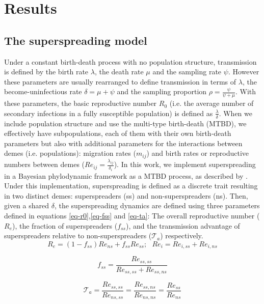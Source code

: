\documentclass[lineno,pdflatex,sn-nature]{sn-jnl}%
\theoremstyle{thmstyleone}%
\theoremstyle{thmstyletwo}%
\theoremstyle{thmstylethree}%
\begin{document}
\section{Results}\label{sec2}

\subsection{The superspreading model}
Under a constant birth-death process with no population structure, transmission is defined by the birth rate $\lambda$, the death rate $\mu$ and the sampling rate $\psi$. However these parameters are usually rearranged to define transmission in terms of $\lambda$, the become-uninfectious rate $\delta = \mu + \psi$ and the sampling proportion $\rho = \frac{\psi}{\psi + \mu}$. With these parameters, the basic reproductive number $R_0$ (i.e. the average number of secondary infections in a fully susceptible population) is defined as $\frac{\lambda}{\delta}$. When we include population structure and use the multi-type birth-death (MTBD), we effectively have subpopulations, each of them with their own birth-death parameters but also with additional parameters for the interactions between demes (i.e. populations): migration rates ($m_{ij}$) and birth rates or reproductive numbers between demes ($Re_{ij} = \frac{\lambda_{ij}}{\delta_i}$). In this work, we implement superspreading in a Bayesian phylodynamic framework as a MTBD process, as described by \cite{RefWorks:stadler2013uncovering, Meehan2023Replicating}. Under this implementation, superspreading is defined as a discrete trait resulting in two distinct demes: superspreaders (ss) and non-superspreaders (ns). Then, given a shared $\delta$, the superspreading dynamics are defined using three parameters defined in equations \ref{eq-r0},\ref{eq-fss} and \ref{eq-ta}: The overall reproductive number ($R_e$), the fraction of superspreaders ($f_{ss}$), and the transmission advantage of superspreaders relative to non-superspreaders ($\mathcal{T}_{a}$) respectively.
\begin{equation}
R_{e} = (1-f_{ss})Re_{ns} + f_{ss}Re_{ss};\ \ \ Re_i = Re_{i,ss} + Re_{i,ns}
\label{eq-r0}
\end{equation}

\begin{equation}
f_{ss} = \frac{Re_{ss,ss}}{Re_{ss,ss} + Re_{ss,ns}}
\label{eq-fss}
\end{equation}

\begin{equation}
\mathcal{T}_a = \frac{Re_{ss,ss}}{Re_{ns,ss}} = \frac{Re_{ss,ns}}{Re_{ns,ns}} = \frac{Re_{ss}}{Re_{ns}}
\label{eq-ta}
\end{equation}\newline
\end{document}
